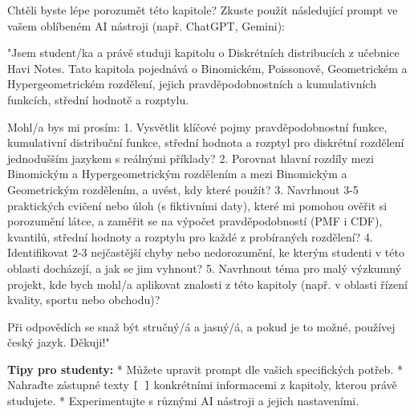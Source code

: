 \documentclass[
  czech,
  11pt,
  letterpaper,
  DIV=11,
  numbers=noendperiod]{scrreprt}
\newenvironment{Shaded}{\begin{snugshade}}{\end{snugshade}}
\newcommand{\NormalTok}[1]{\textcolor[rgb]{0.00,0.23,0.31}{#1}}
\begin{document}
\begin{tcolorbox}[enhanced jigsaw, arc=.35mm, bottomrule=.15mm, bottomtitle=1mm, breakable, colback=white, colbacktitle=quarto-callout-tip-color!10!white, colframe=quarto-callout-tip-color-frame, coltitle=black, left=2mm, leftrule=.75mm, opacityback=0, opacitybacktitle=0.6, rightrule=.15mm, title=\textcolor{quarto-callout-tip-color}{\faLightbulb}\hspace{0.5em}{AI Pomocník pro tuto kapitolu}, titlerule=0mm, toprule=.15mm, toptitle=1mm]

Chtěli byste lépe porozumět této kapitole? Zkuste použít následující
prompt ve vašem oblíbeném AI nástroji (např. ChatGPT, Gemini):

\begin{Shaded}
\begin{Highlighting}[]
\NormalTok{"Jsem student/ka a právě studuji kapitolu o Diskrétních distribucích z učebnice Havi Notes.}
\NormalTok{Tato kapitola pojednává o Binomickém, Poissonově, Geometrickém a Hypergeometrickém rozdělení, jejich pravděpodobnostních a kumulativních funkcích, střední hodnotě a rozptylu.}

\NormalTok{Mohl/a bys mi prosím:}
\NormalTok{1. Vysvětlit klíčové pojmy \textquotesingle{}pravděpodobnostní funkce\textquotesingle{}, \textquotesingle{}kumulativní distribuční funkce\textquotesingle{}, \textquotesingle{}střední hodnota\textquotesingle{} a \textquotesingle{}rozptyl\textquotesingle{} pro diskrétní rozdělení jednodušším jazykem s reálnými příklady?}
\NormalTok{2. Porovnat hlavní rozdíly mezi Binomickým a Hypergeometrickým rozdělením a mezi Binomickým a Geometrickým rozdělením, a uvést, kdy které použít?}
\NormalTok{3. Navrhnout 3{-}5 praktických cvičení nebo úloh (s fiktivními daty), které mi pomohou ověřit si porozumění látce, a zaměřit se na výpočet pravděpodobností (PMF i CDF), kvantilů, střední hodnoty a rozptylu pro každé z probíraných rozdělení?}
\NormalTok{4. Identifikovat 2{-}3 nejčastější chyby nebo nedorozumění, ke kterým studenti v této oblasti docházejí, a jak se jim vyhnout?}
\NormalTok{5. Navrhnout téma pro malý výzkumný projekt, kde bych mohl/a aplikovat znalosti z této kapitoly (např. v oblasti řízení kvality, sportu nebo obchodu)?}

\NormalTok{Při odpovědích se snaž být stručný/á a jasný/á, a pokud je to možné, používej český jazyk. Děkuji!"}
\end{Highlighting}
\end{Shaded}

\textbf{Tipy pro studenty:} * Můžete upravit prompt dle vašich
specifických potřeb. * Nahraďte zástupné texty \texttt{{[}\ {]}}
konkrétními informacemi z kapitoly, kterou právě studujete. *
Experimentujte s různými AI nástroji a jejich nastaveními.

\end{tcolorbox}
\end{document}
